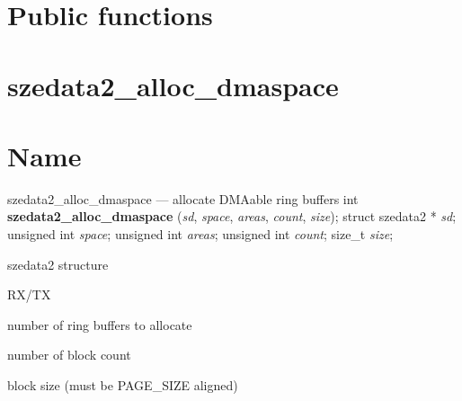 \section{Public functions}
\label{id244906}\hypertarget{id244906}{}%
% 
\section*{szedata2\_alloc\_dmaspace}
\label{API-szedata2-alloc-dmaspace}\hypertarget{API-szedata2-alloc-dmaspace}{}%
\label{id244948}

\section*{Name}
szedata2\_alloc\_dmaspace --- allocate DMAable ring buffers\label{id244958}
\label{id244963}int \textbf{ szedata2\_alloc\_dmaspace } ({\ttfamily\itshape{{sd}}}, {\ttfamily\itshape{{space}}}, {\ttfamily\itshape{{areas}}}, {\ttfamily\itshape{{count}}}, {\ttfamily\itshape{{size}}});
	\newline
	struct szedata2 * {\ttfamily\itshape{{sd}}};
	\newline
	unsigned int {\ttfamily\itshape{{space}}};
	\newline
	unsigned int {\ttfamily\itshape{{areas}}};
	\newline
	unsigned int {\ttfamily\itshape{{count}}};
	\newline
	size\_t {\ttfamily\itshape{{size}}};
\label{id245013}

\begin{kdocdescription}
\item[{{\ttfamily\itshape{{sd}}}}]
szedata2 structure
\item[{{\ttfamily\itshape{{space}}}}]
RX/TX
\item[{{\ttfamily\itshape{{areas}}}}]
number of ring buffers to allocate
\item[{{\ttfamily\itshape{{count}}}}]
number of block count
\item[{{\ttfamily\itshape{{size}}}}]
block size (must be PAGE\_SIZE aligned)
\end{kdocdescription}
\noindent 
{}
\label{id245102}

